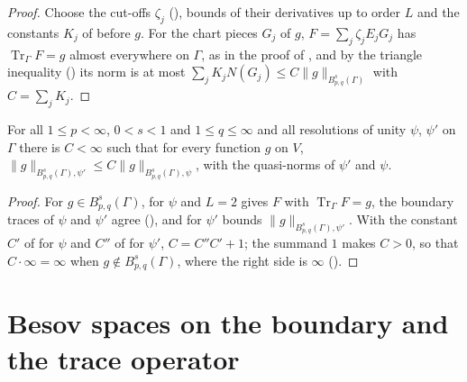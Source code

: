 \begin{proof}
\leanok
Choose the cut-offs $\zeta_j$ (), bounds of their derivatives up to
order $L$ and the constants $K_j$ of  before $g$. For the
chart pieces $G_j$ of $g$, $F = \sum_j \zeta_j E_j G_j$ has
$\operatorname{Tr}_\Gamma F = g$ almost everywhere on $\Gamma$, as in the proof of
, and by the triangle inequality () its norm
is at most $\sum_j K_j N(G_j) \leq C \|g\|_{B^s_{p,q}(\Gamma)}$ with $C = \sum_j K_j$.
\end{proof}

\begin{theorem}
\label{thm:boundary-besov-norm-partition}
\leanok
{}
For all $1 \leq p < \infty$, $0 < s < 1$ and $1 \leq q \leq \infty$ and all resolutions of unity
$\psi$, $\psi'$ on $\Gamma$ there is $C < \infty$ such that for every function $g$ on $V$,
$\|g\|_{B^s_{p,q}(\Gamma), \psi'} \leq C \|g\|_{B^s_{p,q}(\Gamma), \psi}$, with the quasi-norms of
$\psi'$ and $\psi$.
\end{theorem}

\begin{proof}
\leanok
For $g \in B^s_{p,q}(\Gamma)$,  for $\psi$ and $L = 2$
gives $F$ with $\operatorname{Tr}_\Gamma F = g$, the boundary traces of $\psi$ and $\psi'$ agree
(), and  for $\psi'$ bounds
$\|g\|_{B^s_{p,q}(\Gamma), \psi'}$. With the constant $C'$ of
 for $\psi$ and $C''$ of
 for $\psi'$, $C = C'' C' + 1$; the summand $1$ makes
$C > 0$, so that $C \cdot \infty = \infty$ when $g \notin B^s_{p,q}(\Gamma)$, where the right side
is $\infty$ ().
\end{proof}

\section{Besov spaces on the boundary and the trace operator}
\label{sec:boundary-besov-space}

